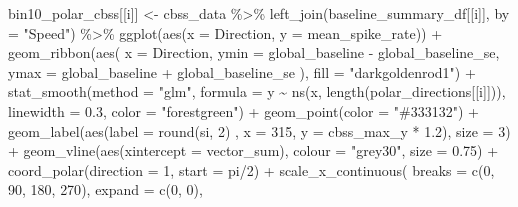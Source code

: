 \documentclass[
]{book}
\newenvironment{Shaded}{\begin{snugshade}}{\end{snugshade}}
\newcommand{\AttributeTok}[1]{\textcolor[rgb]{0.77,0.63,0.00}{#1}}
\newcommand{\DecValTok}[1]{\textcolor[rgb]{0.00,0.00,0.81}{#1}}
\newcommand{\FloatTok}[1]{\textcolor[rgb]{0.00,0.00,0.81}{#1}}
\newcommand{\FunctionTok}[1]{\textcolor[rgb]{0.00,0.00,0.00}{#1}}
\newcommand{\NormalTok}[1]{#1}
\newcommand{\OtherTok}[1]{\textcolor[rgb]{0.56,0.35,0.01}{#1}}
\newcommand{\SpecialCharTok}[1]{\textcolor[rgb]{0.00,0.00,0.00}{#1}}
\newcommand{\StringTok}[1]{\textcolor[rgb]{0.31,0.60,0.02}{#1}}
\begin{document}
\begin{Shaded}
\begin{Highlighting}[]
\NormalTok{  bin10\_polar\_cbss[[i]] }\OtherTok{\textless{}{-}}
\NormalTok{    cbss\_data }\SpecialCharTok{\%\textgreater{}\%}
    \FunctionTok{left\_join}\NormalTok{(baseline\_summary\_df[[i]], }\AttributeTok{by =} \StringTok{"Speed"}\NormalTok{) }\SpecialCharTok{\%\textgreater{}\%}
    \FunctionTok{ggplot}\NormalTok{(}\FunctionTok{aes}\NormalTok{(}\AttributeTok{x =}\NormalTok{ Direction, }\AttributeTok{y =}\NormalTok{ mean\_spike\_rate)) }\SpecialCharTok{+}
    \FunctionTok{geom\_ribbon}\NormalTok{(}\FunctionTok{aes}\NormalTok{(}
      \AttributeTok{x =}\NormalTok{ Direction,}
      \AttributeTok{ymin =}\NormalTok{ global\_baseline }\SpecialCharTok{{-}}\NormalTok{ global\_baseline\_se,}
      \AttributeTok{ymax =}\NormalTok{ global\_baseline }\SpecialCharTok{+}\NormalTok{ global\_baseline\_se}
\NormalTok{    ),}
    \AttributeTok{fill =} \StringTok{"darkgoldenrod1"}\NormalTok{) }\SpecialCharTok{+}
    \FunctionTok{stat\_smooth}\NormalTok{(}\AttributeTok{method =} \StringTok{"glm"}\NormalTok{,}
                \AttributeTok{formula =}\NormalTok{ y }\SpecialCharTok{\textasciitilde{}} \FunctionTok{ns}\NormalTok{(x, }\FunctionTok{length}\NormalTok{(polar\_directions[[i]])),}
                \AttributeTok{linewidth =} \FloatTok{0.3}\NormalTok{, }\AttributeTok{color =} \StringTok{"forestgreen"}\NormalTok{) }\SpecialCharTok{+}
    \FunctionTok{geom\_point}\NormalTok{(}\AttributeTok{color =} \StringTok{"\#333132"}\NormalTok{) }\SpecialCharTok{+}
    \FunctionTok{geom\_label}\NormalTok{(}\FunctionTok{aes}\NormalTok{(}\AttributeTok{label =} \FunctionTok{round}\NormalTok{(si, }\DecValTok{2}\NormalTok{) , }\AttributeTok{x =} \DecValTok{315}\NormalTok{, }\AttributeTok{y =}\NormalTok{ cbss\_max\_y }\SpecialCharTok{*} \FloatTok{1.2}\NormalTok{),}
               \AttributeTok{size =} \DecValTok{3}\NormalTok{) }\SpecialCharTok{+}
    \FunctionTok{geom\_vline}\NormalTok{(}\FunctionTok{aes}\NormalTok{(}\AttributeTok{xintercept =}\NormalTok{ vector\_sum), }\AttributeTok{colour =} \StringTok{"grey30"}\NormalTok{,}
               \AttributeTok{size =} \FloatTok{0.75}\NormalTok{) }\SpecialCharTok{+}
    \FunctionTok{coord\_polar}\NormalTok{(}\AttributeTok{direction =} \DecValTok{1}\NormalTok{, }\AttributeTok{start =}\NormalTok{ pi}\SpecialCharTok{/}\DecValTok{2}\NormalTok{) }\SpecialCharTok{+}
    \FunctionTok{scale\_x\_continuous}\NormalTok{(}
      \AttributeTok{breaks =} \FunctionTok{c}\NormalTok{(}\DecValTok{0}\NormalTok{, }\DecValTok{90}\NormalTok{, }\DecValTok{180}\NormalTok{, }\DecValTok{270}\NormalTok{),}
      \AttributeTok{expand =} \FunctionTok{c}\NormalTok{(}\DecValTok{0}\NormalTok{, }\DecValTok{0}\NormalTok{),}

\end{Highlighting}
\end{Shaded}
\end{document}
